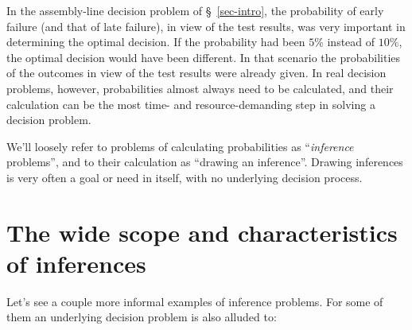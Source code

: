 \documentclass[
  a4paper,
  DIV=11,
  numbers=noendperiod,
  oneside]{scrreprt}
\begin{document}
In the assembly-line decision problem of §~\ref{sec-intro}, the
probability of early failure (and that of late failure), in view of the
test results, was very important in determining the optimal decision. If
the probability had been \(5\%\) instead of \(10\%\), the optimal
decision would have been different. In that scenario the probabilities
of the outcomes in view of the test results were already given. In real
decision problems, however, probabilities almost always need to be
calculated, and their calculation can be the most time- and
resource-demanding step in solving a decision problem.

We'll loosely refer to problems of calculating probabilities as
``\emph{inference} problems'', and to their calculation as ``drawing an
inference''. Drawing inferences is very often a goal or need in itself,
with no underlying decision process.

\hypertarget{sec-inference-scenarios}{%
\section{The wide scope and characteristics of
inferences}\label{sec-inference-scenarios}}

Let's see a couple more informal examples of inference problems. For
some of them an underlying decision problem is also alluded to:
\end{document}
